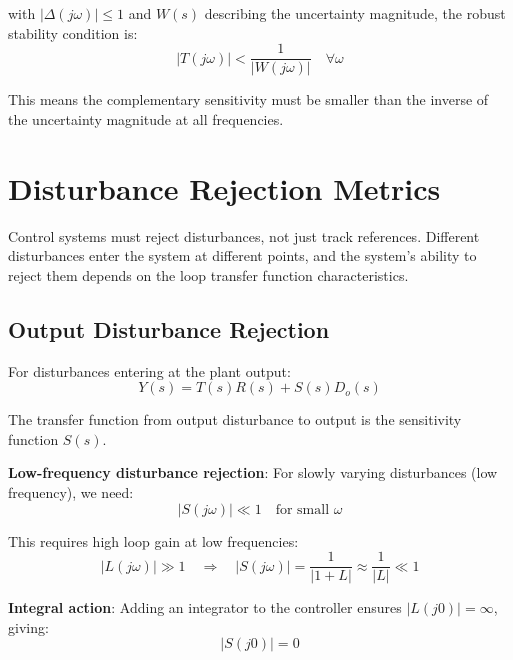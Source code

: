 with $|\Delta(j\omega)| \leq 1$ and $W(s)$ describing the uncertainty magnitude, the robust stability condition is:
\begin{equation}
    \boxed{|T(j\omega)| < \frac{1}{|W(j\omega)|} \quad \forall \omega}
\end{equation}

This means the complementary sensitivity must be smaller than the inverse of the uncertainty magnitude at all frequencies.


\section{Disturbance Rejection Metrics}
\label{sec:disturbance_rejection}

Control systems must reject disturbances, not just track references. Different disturbances enter the system at different points, and the system's ability to reject them depends on the loop transfer function characteristics.

\subsection{Output Disturbance Rejection}

For disturbances entering at the plant output:
\begin{equation}
    Y(s) = T(s) R(s) + S(s) D_o(s)
\end{equation}

The transfer function from output disturbance to output is the sensitivity function $S(s)$.

\textbf{Low-frequency disturbance rejection}: For slowly varying disturbances (low frequency), we need:
\begin{equation}
    |S(j\omega)| \ll 1 \quad \text{for small } \omega
\end{equation}

This requires high loop gain at low frequencies:
\begin{equation}
    |L(j\omega)| \gg 1 \quad \Rightarrow \quad |S(j\omega)| = \frac{1}{|1 + L|} \approx \frac{1}{|L|} \ll 1
\end{equation}

\textbf{Integral action}: Adding an integrator to the controller ensures $|L(j0)| = \infty$, giving:
\begin{equation}
    |S(j0)| = 0
\end{equation}

